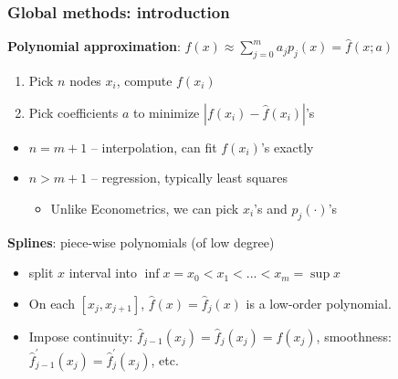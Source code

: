 \documentclass[bigger]{beamer}
\begin{document}
\begin{frame}%

\frametitle{Global methods: introduction}

\textbf{Polynomial approximation}: $f(x)\approx \sum_{j=0}^{m}a_{j}p_{j}(x)=%
\hat{f}(x;a)$

\begin{enumerate}
\item Pick $n$ nodes $x_{i}$, compute $f(x_{i})$

\item Pick coefficients $a$ to minimize $\left\vert f\left( x_{i}\right) -%
\hat{f}\left( x_{i}\right) \right\vert $'s
\end{enumerate}

\begin{itemize}
\item $n=m+1$ -- interpolation, can fit $f(x_{i})$'s exactly

\item $n>m+1$ -- regression, typically least squares

\begin{itemize}
\item Unlike Econometrics, we can pick $x_{i}$'s and $p_{j}(\cdot )$'s
\end{itemize}
\end{itemize}

\textbf{Splines}: piece-wise polynomials (of low degree)

\begin{itemize}
\item split $x$ interval into $\inf x=x_{0}<x_{1}<...<x_{m}=\sup x$

\item On each $\left[ x_{j},x_{j+1}\right] $, $\hat{f}(x)=\hat{f}_{j}(x)$ is
a low-order polynomial.

\item Impose continuity: $\hat{f}_{j-1}(x_{j})=\hat{f}_{j}(x_{j})=f\left(
x_{j}\right) $, \newline
smoothness: $\hat{f}_{j-1}^{\prime }(x_{j})=\hat{f}_{j}^{\prime }(x_{j})$,
etc.
\end{itemize}

\end{frame}%
\end{document}
